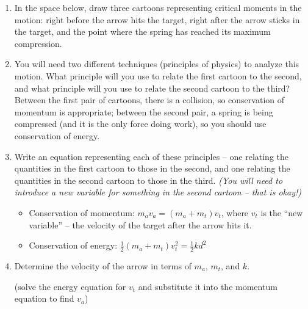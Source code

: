 \documentclass[12pt]{article}
\begin{document}
\begin{enumerate}
	\item In the space below, draw three cartoons representing critical moments in the motion: right before the arrow hits the target, right after the arrow sticks in the target, and the point where the spring has reached its maximum compression.

	
	\item You will need two different techniques (principles of physics) to analyze this motion. What principle will you use to relate the first cartoon to the second, and what principle will you use to relate the second cartoon to the third?
{\color{red} Between the first pair of cartoons, there is a collision, so conservation of momentum is appropriate; between the second pair, a spring is being compressed (and it is the only force doing work), so you should use conservation of energy.}

	
	\item Write an equation representing each of these principles -- one relating the quantities in the first cartoon to those in the second, and one relating the quantities in the second cartoon to those in the third. {\it (You will need to introduce a new variable for something in the second cartoon -- that is okay!)}
	
{\color{red}
	
	\begin{itemize}
		\item Conservation of momentum: $m_a v_a = (m_a + m_t) v_t$, where $v_t$ is the ``new variable'' -- the velocity of the target after the arrow hits it.
		
		\item Conservation of energy: $\frac{1}{2}(m_a + m_t) v_t^2 = \frac{1}{2}kd^2$
	\end{itemize}
}
	\item Determine the velocity of the arrow in terms of $m_a$, $m_t$, and $k$.

{\color{red}(solve the energy equation for $v_t$ and substitute it into the momentum equation to find $v_a$)}	
		

\end{enumerate}
\end{document}
